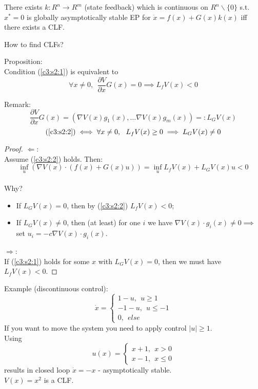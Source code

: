\begin{Theorem}[Artstein]
 There exists $k:R^n \to R^m$ (state feedback) which is continuous on $R^n \backslash \{ 0 \}$ s.t. $x^*=0$ is globally asymptotically stable EP for $\dot x = f(x)+G(x)k(x)$ iff there exists a CLF.
\end{Theorem}

How to find CLFs?

Proposition: \\
Condition (\ref{c3:s2:1}) is equivalent to
 \begin{equation} \label{c3:s2:2}
     \forall x \neq 0, \ \ \frac{\partial V}{\partial x}G(x) = 0 \implies L_fV(x) < 0 
 \end{equation}

Remark: 
$$\frac{\partial V}{\partial x}G(x) = (\nabla V(x)g_1(x), \dots \nabla V(x)g_m(x)) =: L_GV(x)$$
$$(\ref{c3:s2:2}) \iff \forall x \neq 0, \ \ L_fV(x) \ge 0 \implies L_GV(x) \neq 0$$
\begin{proof}
    $\Longleftarrow$: \\
    Assume (\ref{c3:s2:2}) holds. Then: \\
    $$\inf_u (\nabla V(x) \cdot (f(x)+G(x)u)) = \inf_u L_fV(x)+L_GV(x)u < 0$$ \\
    Why?
    \begin{itemize}
        \item If $L_GV(x) = 0$, then by (\ref{c3:s2:2}) $L_fV(x) < 0$;
        \item If $L_GV(x) \neq 0$, then (at least) for one $i$ we have $\nabla V(x) \cdot g_i(x) \neq 0 \implies$ set $u_i = -c \nabla V(x) \cdot g_i(x)$.
    \end{itemize}
    
    $\Longrightarrow$: \\
    If (\ref{c3:s2:1}) holds for some $x$ with $L_GV(x)=0$, then we must have $L_fV(x) < 0$.
\end{proof}

Example (discontinuous control):
$$\dot x = \left\{
                \begin{array}{ll}
                  1-u, \ \ u \ge 1\\
                  -1-u, \ \ u \le -1\\
                  0, \ \ else
                \end{array}
              \right.$$
If you want to move the system you need to apply control $|u| \ge 1$. \\
Using $$u(x) = \left\{
                \begin{array}{ll}
                  x+1, \ \ x>0\\
                  x-1, \ \ x \le 0
                \end{array}
              \right.$$
results in closed loop $\dot x = -x$ - asymptotically stable.\\
$V(x) = x^2$ is a CLF.

